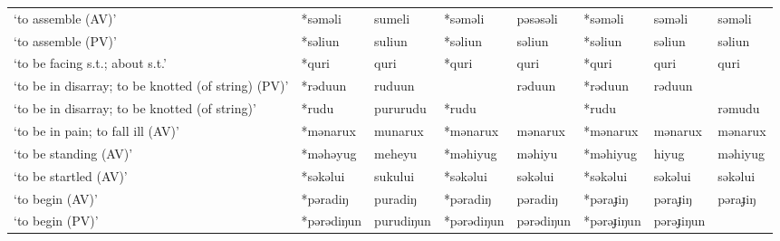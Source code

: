 \begin{landscape}
\begin{longtable}[c]{@{}p{3cm}<{\raggedright}p{2.75cm}<{\raggedright}p{2.75cm}<{\raggedright}p{2.75cm}<{\raggedright}p{2.75cm}<{\raggedright}p{2.75cm}<{\raggedright}p{2.75cm}<{\raggedright}p{2.75cm}<{\raggedright}@{}}
`to assemble (AV)'                                   & *səməli      & sumeli                        & *səməli        & pəsəsəli                   & *səməli          & səməli                   & səməli                            \\
`to assemble (PV)'                                   & *səliun      & suliun                        & *səliun        & səliun                     & *səliun          & səliun                   & səliun                            \\
`to be facing s.t.; about s.t.'                      & *quri        & quri                          & *quri          & quri                       & *quri            & quri                     & quri                              \\
`to be in disarray; to be knotted (of string) (PV)'  & *rəduun      & ruduun                        &                & rəduun                     & *rəduun          & rəduun                   &                                   \\
`to be in disarray; to be knotted (of string)'       & *rudu        & pururudu                      & *rudu          &                            & *rudu            &                          & rəmudu                            \\
`to be in pain; to fall ill (AV)'                    & *mənarux     & munarux                       & *mənarux       & mənarux                    & *mənarux         & mənarux                  & mənarux                           \\
`to be standing (AV)'                                & *məhəyug     & meheyu                        & *məhiyug       & məhiyu                     & *məhiyug         & hiyug                    & məhiyug                           \\
`to be startled (AV)'                                & *səkəlui     & sukului                       & *səkəlui       & səkəlui                    & *səkəlui         & səkəlui                  & səkəlui                           \\
`to begin (AV)'                                      & *pəradiŋ     & puradiŋ                       & *pəradiŋ       & pəradiŋ                    & *pəraɟiŋ         & pəraɟiŋ                  & pəraɟiŋ                           \\
`to begin (PV)'                                      & *pərədiŋun   & purudiŋun                     & *pərədiŋun     & pərədiŋun                  & *pərəɟiŋun       & pərəɟiŋun                &                                   \\

\end{longtable}
\end{landscape}
